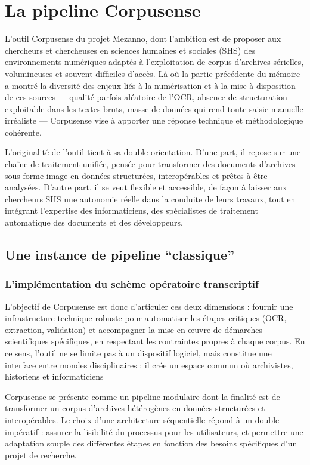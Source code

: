 \chapter{La pipeline Corpusense}

L’outil Corpusense du projet Mezanno, dont l’ambition est de proposer aux chercheurs et chercheuses en sciences humaines et sociales (SHS) des environnements numériques adaptés à l’exploitation de corpus d’archives sérielles, volumineuses et souvent difficiles d’accès. Là où la partie précédente du mémoire a montré la diversité des enjeux liés à la numérisation et à la mise à disposition de ces sources — qualité parfois aléatoire de l’OCR, absence de structuration exploitable dans les textes bruts, masse de données qui rend toute saisie manuelle irréaliste — Corpusense vise à apporter une réponse technique et méthodologique cohérente.

L’originalité de l’outil tient à sa double orientation. D’une part, il repose sur une chaîne de traitement unifiée, pensée pour transformer des documents d’archives sous forme image en données structurées, interopérables et prêtes à être analysées. D’autre part, il se veut flexible et accessible, de façon à laisser aux chercheurs SHS une autonomie réelle dans la conduite de leurs travaux, tout en intégrant l’expertise des informaticiens, des spécialistes de traitement automatique des documents et des développeurs.

\section{Une instance de pipeline \enquote{classique}}

\subsection{L'implémentation du schème opératoire transcriptif}

L’objectif de Corpusense est donc d’articuler ces deux dimensions : fournir une infrastructure technique robuste pour automatiser les étapes critiques (OCR, extraction, validation) et accompagner la mise en œuvre de démarches scientifiques spécifiques, en respectant les contraintes propres à chaque corpus. En ce sens, l’outil ne se limite pas à un dispositif logiciel, mais constitue une interface entre mondes disciplinaires : il crée un espace commun où archivistes, historiens et informaticiens 

Corpusense se présente comme un pipeline modulaire dont la finalité est de transformer un corpus d’archives hétérogènes en données structurées et interopérables. Le choix d’une architecture séquentielle répond à un double impératif : assurer la lisibilité du processus pour les utilisateurs, et permettre une adaptation souple des différentes étapes en fonction des besoins spécifiques d’un projet de recherche.

